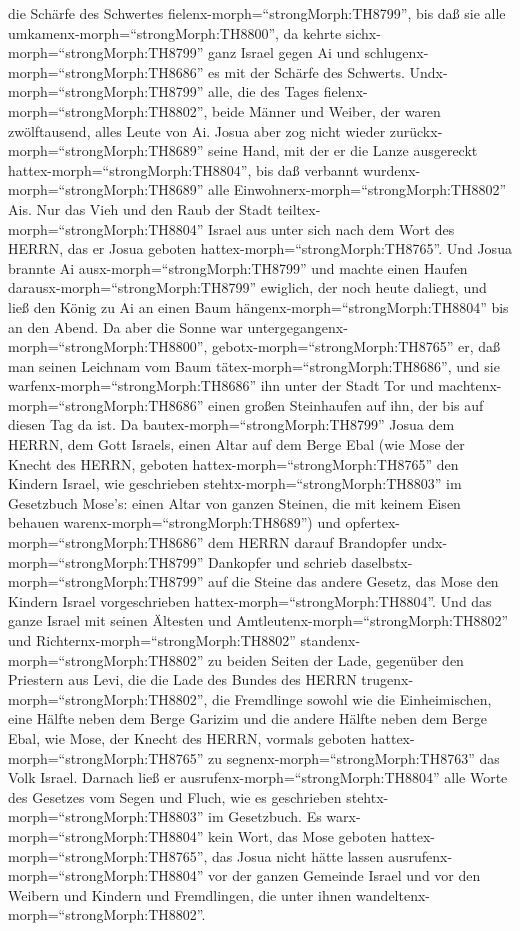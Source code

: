 die Schärfe des Schwertes fielenx-morph=``strongMorph:TH8799'', bis daß
sie alle umkamenx-morph=``strongMorph:TH8800'', da kehrte
sichx-morph=``strongMorph:TH8799'' ganz Israel gegen Ai und
schlugenx-morph=``strongMorph:TH8686'' es mit der Schärfe des Schwerts.
 Undx-morph=``strongMorph:TH8799'' alle, die des Tages
fielenx-morph=``strongMorph:TH8802'', beide Männer und Weiber, der waren
zwölftausend, alles Leute von Ai.  Josua aber zog nicht
wieder zurückx-morph=``strongMorph:TH8689'' seine Hand, mit der er die
Lanze ausgereckt hattex-morph=``strongMorph:TH8804'', bis daß verbannt
wurdenx-morph=``strongMorph:TH8689'' alle
Einwohnerx-morph=``strongMorph:TH8802'' Ais.  Nur das Vieh
und den Raub der Stadt teiltex-morph=``strongMorph:TH8804'' Israel aus
unter sich nach dem Wort des HERRN, das er Josua geboten
hattex-morph=``strongMorph:TH8765''.  Und Josua brannte Ai
ausx-morph=``strongMorph:TH8799'' und machte einen Haufen
darausx-morph=``strongMorph:TH8799'' ewiglich, der noch heute daliegt,
 und ließ den König zu Ai an einen Baum
hängenx-morph=``strongMorph:TH8804'' bis an den Abend. Da aber die Sonne
war untergegangenx-morph=``strongMorph:TH8800'',
gebotx-morph=``strongMorph:TH8765'' er, daß man seinen Leichnam vom Baum
tätex-morph=``strongMorph:TH8686'', und sie
warfenx-morph=``strongMorph:TH8686'' ihn unter der Stadt Tor und
machtenx-morph=``strongMorph:TH8686'' einen großen Steinhaufen auf ihn,
der bis auf diesen Tag da ist.  Da
bautex-morph=``strongMorph:TH8799'' Josua dem HERRN, dem Gott Israels,
einen Altar auf dem Berge Ebal  (wie Mose der Knecht des
HERRN, geboten hattex-morph=``strongMorph:TH8765'' den Kindern Israel,
wie geschrieben stehtx-morph=``strongMorph:TH8803'' im Gesetzbuch
Mose's: einen Altar von ganzen Steinen, die mit keinem Eisen behauen
warenx-morph=``strongMorph:TH8689'') und
opfertex-morph=``strongMorph:TH8686'' dem HERRN darauf Brandopfer
undx-morph=``strongMorph:TH8799'' Dankopfer  und schrieb
daselbstx-morph=``strongMorph:TH8799'' auf die Steine das andere Gesetz,
das Mose den Kindern Israel vorgeschrieben
hattex-morph=``strongMorph:TH8804''.  Und das ganze Israel
mit seinen Ältesten und Amtleutenx-morph=``strongMorph:TH8802'' und
Richternx-morph=``strongMorph:TH8802''
standenx-morph=``strongMorph:TH8802'' zu beiden Seiten der Lade,
gegenüber den Priestern aus Levi, die die Lade des Bundes des HERRN
trugenx-morph=``strongMorph:TH8802'', die Fremdlinge sowohl wie die
Einheimischen, eine Hälfte neben dem Berge Garizim und die andere Hälfte
neben dem Berge Ebal, wie Mose, der Knecht des HERRN, vormals geboten
hattex-morph=``strongMorph:TH8765'' zu
segnenx-morph=``strongMorph:TH8763'' das Volk Israel. 
Darnach ließ er ausrufenx-morph=``strongMorph:TH8804'' alle Worte des
Gesetzes vom Segen und Fluch, wie es geschrieben
stehtx-morph=``strongMorph:TH8803'' im Gesetzbuch.  Es
warx-morph=``strongMorph:TH8804'' kein Wort, das Mose geboten
hattex-morph=``strongMorph:TH8765'', das Josua nicht hätte lassen
ausrufenx-morph=``strongMorph:TH8804'' vor der ganzen Gemeinde Israel
und vor den Weibern und Kindern und Fremdlingen, die unter ihnen
wandeltenx-morph=``strongMorph:TH8802''.

